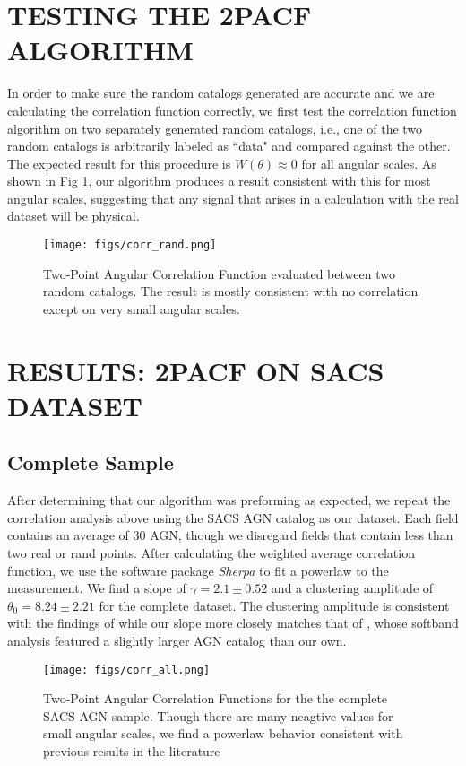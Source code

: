\documentclass[preprint]{aastex63}
\begin{document}
\section{TESTING THE 2PACF ALGORITHM}
In order to make sure the random catalogs generated are accurate and we are calculating the correlation function correctly,
we first test the correlation function algorithm on two separately generated random catalogs, i.e., one of the two random catalogs 
is arbitrarily labeled as ``data" and compared against the other. 
The expected result for this procedure is  $W(\theta) \approx 0$ for all angular scales.  As shown in Fig \ref{fig:corr_rand}, our algorithm 
produces a result consistent with this  for most angular scales, suggesting that any signal that
arises in a calculation with the real dataset will be physical.
\begin{figure}[!ht]
    \centering
    \texttt{[image: figs/corr\_rand.png]}
    \label{fig:corr_rand}
    \caption{Two-Point Angular Correlation Function evaluated between
    two random catalogs. The result is mostly consistent with no correlation except 
    on very small angular scales.}
\end{figure}


\section{RESULTS: 2PACF ON SACS DATASET}
\subsection{Complete Sample}
After determining that our algorithm was preforming as expected, we repeat the correlation analysis above 
using the SACS AGN catalog as our dataset. Each field contains an average of 30 AGN, though we disregard fields 
that contain less than two real or rand points. After calculating the weighted average correlation function,
we use the software package \textit{Sherpa} \citep{sherpa} to fit a powerlaw to the measurement. We find a slope of 
$\gamma = 2.1 \pm 0.52$ and a clustering amplitude of $\theta_0 = 8.24 \pm 2.21$ for the complete dataset. The clustering
amplitude is consistent with the findings of  \citet{elyiv} while our slope more closely matches that of \citet{ebrero}, whose softband analysis
featured a slightly larger AGN catalog than our own. 

\begin{figure}[!h]
    \centering
    \texttt{[image: figs/corr\_all.png]}
    \label{fig:corr_all}
    \caption{Two-Point Angular Correlation Functions for the the complete SACS AGN sample. Though there are many
    neagtive values for small angular scales, we find a powerlaw behavior consistent with 
    previous results in the literature }
\end{figure}
\end{document}
